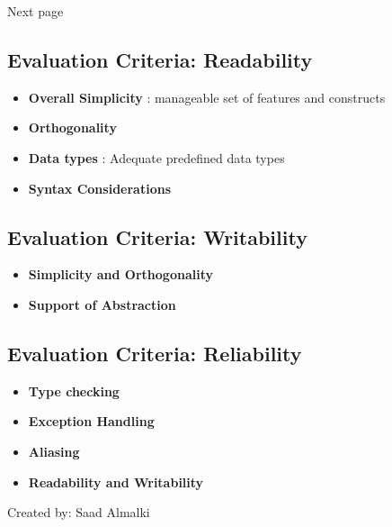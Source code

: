 \documentclass[12pt]{article}
\begin{document}
Next page



\subsection{Evaluation Criteria: Readability}
\begin{itemize}
    \item \textbf{Overall Simplicity} : manageable set of features and constructs
    \item \textbf{Orthogonality}
    \item \textbf{Data types} : Adequate predefined data types
    \item \textbf{Syntax Considerations}
\end{itemize}

\subsection{Evaluation Criteria: Writability}
\begin{itemize}
    \item \textbf{Simplicity and Orthogonality}
    \item \textbf{Support of Abstraction}
\end{itemize}


\subsection{Evaluation Criteria: Reliability}
\begin{itemize}
    \item \textbf{Type checking}
    \item \textbf{Exception Handling}
    \item \textbf{Aliasing}
    \item \textbf{Readability and Writability}
\end{itemize}





\begin{flushright}
Created by: Saad Almalki \\
\end{flushright}
\end{document}
